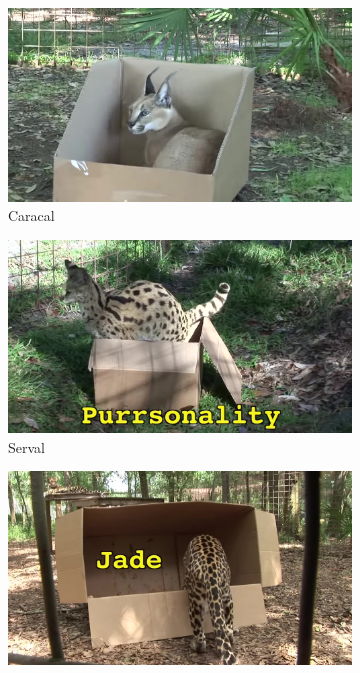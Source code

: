\documentclass[12pt,a4paper]{article}
\begin{document}
\begin{figure}[h!]
    \begin{subfigure}[b]{0.24\textwidth}
        \includegraphics[width=\textwidth]{05_rusty_caracal.jpg}
        \caption{Caracal}
        \label{fig:caracal}
    \end{subfigure}
    \hfill
    \begin{subfigure}[b]{0.24\textwidth}
        \includegraphics[width=\textwidth]{06_purrsonality_serval.jpg}
        \caption{Serval}
        \label{fig:serval}
    \end{subfigure}
    \hfill
    \begin{subfigure}[b]{0.24\textwidth}
        \includegraphics[width=\textwidth]{07_jade_armani_leopards.jpg}

\end{subfigure}
\end{figure}
\end{document}
